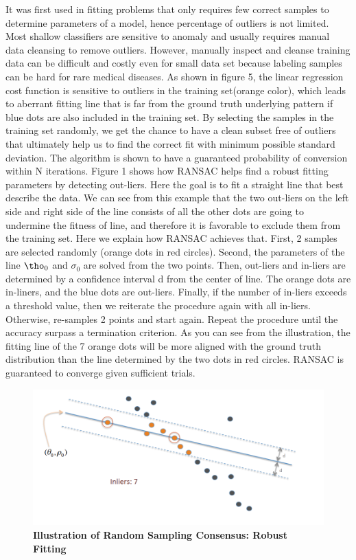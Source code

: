 \documentclass[a4paper, times, 12pt, ,onecolumn,oneside,top=1.0cm,bottom=1.0cm,left=1.0 cm,right=1cm]{article}
\begin{document}
It was first used in fitting problems that only requires few correct samples to determine parameters of a model, hence percentage of outliers is not limited. Most shallow classifiers are sensitive to anomaly and usually requires manual data cleansing to remove outliers. However, manually inspect and cleanse training data can be difficult and costly even for small data set because labeling samples can be hard for rare medical diseases. As shown in figure 5, the linear regression cost function is sensitive to outliers in the training set(orange color), which leads to aberrant fitting line that is far from the ground truth underlying pattern if blue dots are also included in the training set. By selecting the samples in the training set randomly, we get the chance to have a clean subset free of outliers that ultimately help us to find the correct fit with minimum possible standard deviation. The algorithm is shown to have a guaranteed probability of conversion within N iterations.    
Figure 1 shows how RANSAC helps find a robust fitting parameters by detecting out-liers. Here the goal is to fit a straight line that best describe the data. We can see from this example that the two out-liers on the left side and right side of the line consists of all the other dots are going to undermine the fitness of line, and therefore it is favorable to exclude them from the training set. Here we explain how RANSAC achieves that. First, 2 samples are selected randomly (orange dots in red circles). Second, the parameters of the line $\tho_{0}$ and $\sigma_{0}$ are solved from the two points. Then, out-liers and in-liers are determined by a confidence interval d from the center of line. The orange dots are in-liners, and the blue dots are out-liers. Finally, if the number of in-liers exceeds a threshold value, then we reiterate the procedure again with all in-liers. Otherwise, re-samples 2 points and start again. Repeat the procedure until the accuracy surpass a termination criterion. As you can see from the illustration, the fitting line of the 7 orange dots will be more aligned with the ground truth distribution than the line determined by the two dots in red circles. RANSAC is guaranteed to converge given sufficient trials.
\begin{figure}
\begin{center}
  \includegraphics[scale=0.25]{imgs/intro_2.png}
  \caption{\textbf{Illustration of Random Sampling Consensus:  Robust Fitting }}
\end{center}
\end{figure}
\end{document}

